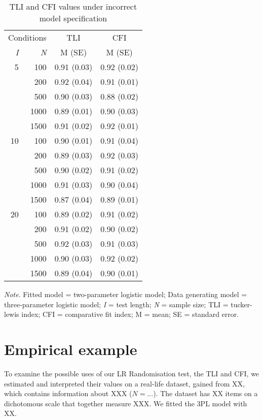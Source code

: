 \documentclass[Royal,sageapa,times,doublespace]{sagej}
\begin{document}
\begin{table}[ht]
\caption{TLI and CFI values under incorrect model specification}
\begin{tabular}{ r r | c c }
\toprule
\multicolumn{2}{c}{Conditions} & \multicolumn{1}{c}{TLI} & \multicolumn{1}{c}{CFI} \\
\textit{I} & \textit{N} & M (SE) & M (SE) \\
\midrule
 5 & 100 & 0.91 (0.03) & 0.92 (0.02) \\
& 200 & 0.92 (0.04) & 0.91 (0.01) \\
& 500 & 0.90 (0.03) & 0.88 (0.02) \\
& 1000 & 0.89 (0.01) & 0.90 (0.03)\\
& 1500 & 0.91 (0.02) & 0.92 (0.01)\\
10 & 100 & 0.90 (0.01) & 0.91 (0.04)\\
& 200 & 0.89 (0.03) & 0.92 (0.03)\\
& 500 & 0.90 (0.02) & 0.91 (0.02)\\
& 1000 & 0.91 (0.03) & 0.90 (0.04)\\
& 1500 & 0.87 (0.04) & 0.89 (0.01)\\
20 & 100 & 0.89 (0.02) & 0.91 (0.02)\\
& 200 & 0.91 (0.02) & 0.90 (0.02) \\
& 500 & 0.92 (0.03) & 0.91 (0.03)\\
& 1000 & 0.90 (0.03) & 0.92 (0.02)\\
& 1500 & 0.89 (0.04)& 0.90 (0.01)\\
\bottomrule
\end{tabular}

\bigskip
\small\textit{Note}. Fitted model = two-parameter logistic model; Data generating model = three-parameter logistic model; \textit{I} = test length; \textit{N} = sample size; TLI = tucker-lewis index; CFI = comparative fit index; M = mean; SE = standard error.
\label{tab:5}
\end{table}

\newpage

\section{Empirical example}
To examine the possible uses of our LR Randomisation test, the TLI and CFI, we estimated and interpreted their values on a real-life dataset, gained from XX, which contains information about XXX ($N = ...$). The dataset has XX items on a dichotomous scale that together measure XXX. We fitted the 3PL model with XX.
\end{document}
